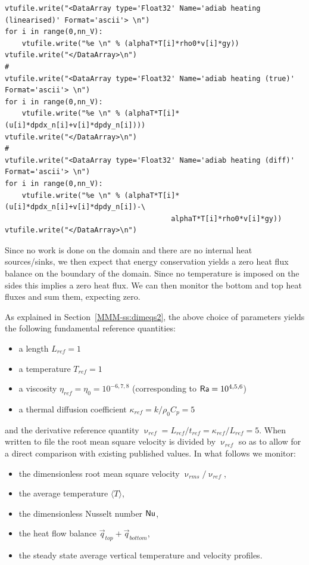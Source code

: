 \begin{lstlisting}
vtufile.write("<DataArray type='Float32' Name='adiab heating (linearised)' Format='ascii'> \n")
for i in range(0,nn_V):
    vtufile.write("%e \n" % (alphaT*T[i]*rho0*v[i]*gy))
vtufile.write("</DataArray>\n")
#
vtufile.write("<DataArray type='Float32' Name='adiab heating (true)' Format='ascii'> \n")
for i in range(0,nn_V):
    vtufile.write("%e \n" % (alphaT*T[i]*(u[i]*dpdx_n[i]+v[i]*dpdy_n[i]))) 
vtufile.write("</DataArray>\n")
#
vtufile.write("<DataArray type='Float32' Name='adiab heating (diff)' Format='ascii'> \n")
for i in range(0,nn_V):
    vtufile.write("%e \n" % (alphaT*T[i]*(u[i]*dpdx_n[i]+v[i]*dpdy_n[i])-\
                                       alphaT*T[i]*rho0*v[i]*gy))
vtufile.write("</DataArray>\n")
\end{lstlisting}

Since no work is done on the domain and there are no internal heat sources/sinks, we then 
expect that energy conservation yields a zero heat flux balance on the boundary of the domain. 
Since no temperature is imposed on the sides this implies a zero heat flux. 
We can then monitor the bottom and top heat fluxes and sum them, expecting zero.  

As explained in Section~\ref{MMM-ss:dimeqs2}, the above choice of parameters yields the following 
fundamental reference quantities:
\begin{itemize}
\item a length $L_{ref}=1$ 
\item a temperature $T_{ref}=1$ 
\item a viscosity $\eta_{ref}=\eta_0=10^{-6,7,8}$ (corresponding to ${\mathsf{Ra}}=10^{4,5,6}$) 
\item a thermal diffusion coefficient $\kappa_{ref}=k/\rho_0 C_p = 5$ 
\end{itemize}
and the derivative reference quantity $\upnu_{ref} = L_{ref} / t_{ref} = \kappa_{ref}/L_{ref} = 5$.
When written to file the root mean square velocity is divided by $\upnu_{ref}$ so as to allow
for a direct comparison with existing published values.
In what follows we monitor:
\begin{itemize}
\item the dimensionless root mean square velocity $\upnu_{rms}/\upnu_{ref}$,
\item the average temperature $\langle T \rangle$,
\item the dimensionless Nusselt number ${\mathsf{Nu}}$,
\item the heat flow balance $\vec{q}_{top}+\vec{q}_{bottom}$,
\item the steady state average vertical temperature and velocity profiles.
\end{itemize}

